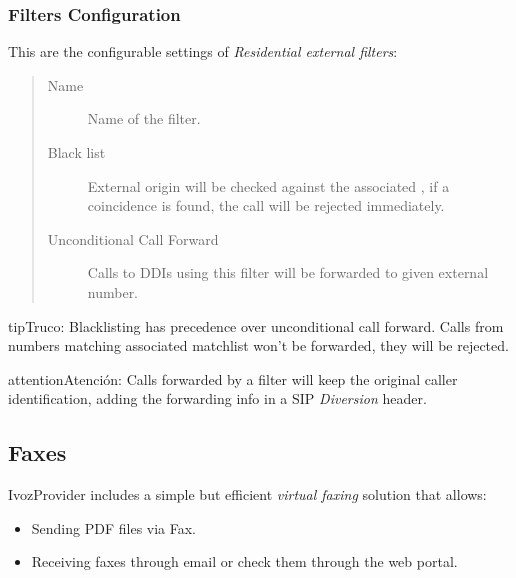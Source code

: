 \documentclass[letterpaper,10pt,spanish]{sphinxmanual}
\begin{document}
\subsubsection{Filters Configuration}
\label{administration_portal/client/residential/external_call_filters:filters-configuration}
This are the configurable settings of \emph{Residential external filters}:
\begin{quote}
\begin{description}
\item[{Name}] \leavevmode
Name of the filter.

\item[{Black list}] \leavevmode
External origin will be checked against the associated {\hyperref[administration_portal/client/vpbx/routing_tools/match_lists:match\string-lists]{}},
if a coincidence is found, the call will be rejected immediately.

\item[{Unconditional Call Forward}] \leavevmode
Calls to DDIs using this filter will be forwarded to given external number.

\end{description}
\end{quote}

\begin{notice}{tip}{Truco:}
Blacklisting has precedence over unconditional call forward. Calls from numbers
matching associated matchlist won't be forwarded, they will be rejected.
\end{notice}

\begin{notice}{attention}{Atención:}
Calls forwarded by a filter will keep the original
caller identification, adding the forwarding info in a SIP
\emph{Diversion} header.
\end{notice}


\subsection{Faxes}
\label{administration_portal/client/residential/faxes:faxes}\label{administration_portal/client/residential/faxes::doc}
IvozProvider includes a simple but efficient \emph{virtual faxing} solution that allows:
\begin{itemize}
\item {} 
Sending PDF files via Fax.

\item {} 
Receiving faxes through email or check them through the web portal.

\end{itemize}
\end{document}
